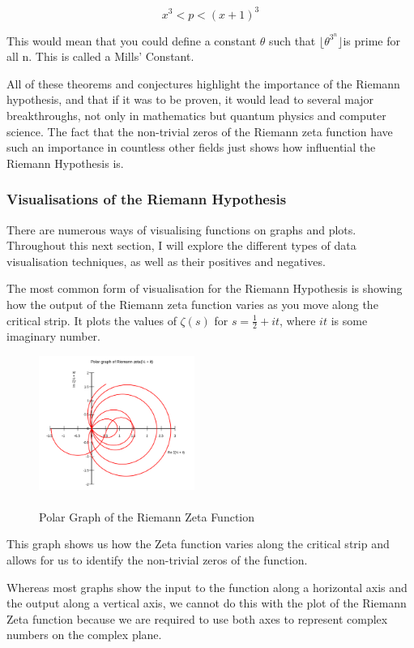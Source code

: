 \documentclass{article}
\begin{document}
$$x^3 < p < (x+1)^3$$

This would mean that you could define a constant $\theta$ such that $\lfloor \theta^{3^n} \rfloor$is prime for all n. This is called a Mills’ Constant.

All of these theorems and conjectures highlight the importance of the Riemann hypothesis, and that if it was to be proven, it would lead to several major breakthroughs, not only in mathematics but quantum physics and computer science. The fact that the non-trivial zeros of the Riemann zeta function have such an importance in countless other fields just shows how influential the Riemann Hypothesis is.

\subsubsection{Visualisations of the Riemann Hypothesis}

There are numerous ways of visualising functions on graphs and plots. Throughout this next section, I will explore the different types of data visualisation techniques, as well as their positives and negatives.


The most common form of visualisation for the Riemann Hypothesis is showing how the output of the Riemann zeta function varies as you move along the critical strip. It plots the values of $\zeta(s)$ for $s = \frac{1}{2} + it$, where $it$ is some imaginary number.


\begin{figure}
    \centering
    \captionsetup{justification=centering}
    \includegraphics[width=2.0in]{Zeta-Polar-Graph}
    \caption{\\Polar Graph of the Riemann Zeta Function}
\end{figure}

This graph shows us how the Zeta function varies along the critical strip and allows for us to identify the non-trivial zeros of the function.

Whereas most graphs show the input to the function along a horizontal axis and the output along a vertical axis, we cannot do this with the plot of the Riemann Zeta function because we are required to use both axes to represent complex numbers on the complex plane.
\end{document}
